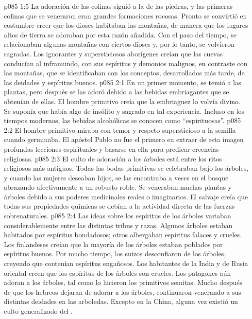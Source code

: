 \vs p085 1:5 La adoración de las colinas siguió a la de las piedras, y las primeras colinas que se veneraron eran grandes formaciones rocosas. Pronto se convirtió en costumbre creer que los dioses habitaban las montañas, de manera que los lugares altos de tierra se adoraban por esta razón añadida. Con el paso del tiempo, se relacionaban algunas montañas con ciertos dioses y, por lo tanto, se volvieron sagradas. Los ignorantes y supersticiosos aborígenes creían que las cuevas conducían al inframundo, con sus espíritus y demonios malignos, en contraste con las montañas, que se identificaban con los conceptos, desarrollados más tarde, de las deidades y espíritus buenos.
\vs p085 2:1 En un primer momento, se temió a las plantas, pero después se las adoró debido a las bebidas embriagantes que se obtenían de ellas. El hombre primitivo creía que la embriaguez lo volvía divino. Se suponía que había algo de insólito y sagrado en tal experiencia. Incluso en los tiempos modernos, las bebidas alcohólicas se conocen como “espirituosas”.
\vs p085 2:2 El hombre primitivo miraba con temor y respeto supersticioso a la semilla cuando germinaba. El apóstol Pablo no fue el primero en extraer de esta imagen profundas lecciones espirituales y basarse en ella para predicar creencias religiosas.
\vs p085 2:3 El culto de adoración a los árboles está entre los ritos religiosos más antiguos. Todas las bodas primitivas se celebraban bajo los árboles, y cuando las mujeres deseaban hijos, se las encontraba a veces en el bosque abrazando afectivamente a un robusto roble. Se veneraban muchas plantas y árboles debido a sus poderes medicinales reales o imaginarios. El salvaje creía que todas sus propiedades químicas se debían a la actividad directa de las fuerzas sobrenaturales.
\vs p085 2:4 Las ideas sobre los espíritus de los árboles variaban considerablemente entre las distintas tribus y razas. Algunos árboles estaban habitados por espíritus bondadosos; otros albergaban espíritus falaces y crueles. Los finlandeses creían que la mayoría de los árboles estaban poblados por espíritus buenos. Por mucho tiempo, los suizos desconfiaron de los árboles, creyendo que contenían espíritus engañosos. Los habitantes de la India y de Rusia oriental creen que los espíritus de los árboles son crueles. Los patagones aún adoran a los árboles, tal como lo hicieron los primitivos semitas. Mucho después de que los hebreos dejaran de adorar a los árboles, continuaron venerando a sus distintas deidades en las arboledas. Excepto en la China, alguna vez existió un culto generalizado del .

